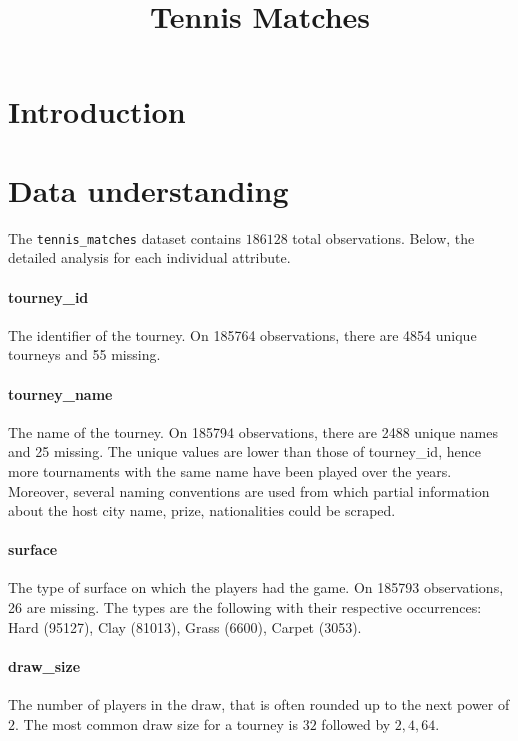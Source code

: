 \documentclass{article}
\title{Tennis Matches}
\begin{document}
    

\tableofcontents
\newpage



\section{Introduction}

\section{Data understanding}
The \texttt{tennis\_matches} dataset contains $186128$ total observations. Below, the detailed analysis for each individual attribute.

\paragraph{tourney\_id}
The identifier of the tourney. On 185764 observations, there are 4854 unique tourneys and 55 missing.

\paragraph{tourney\_name}
The name of the tourney. On 185794 observations, there are 2488 unique names and 25 missing. The unique values are lower than those of tourney\_id, hence more tournaments with the same name have been played over the years. Moreover, several naming conventions are used from which partial information about the host city name, prize, nationalities could be scraped.

\paragraph{surface}
The type of surface on which the players had the game. On 185793 observations, 26 are missing. The types are the following with their respective occurrences: Hard (95127), Clay (81013), Grass (6600), Carpet (3053).

\paragraph{draw\_size}
The number of players in the draw, that is often rounded up to the next power of $2$. The most common draw size for a tourney is $32$ followed by $2,4,64$.
\end{document}

